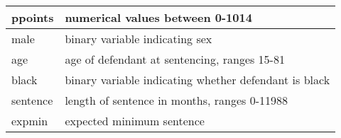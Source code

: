 \begin{tabular}{|l|l|}
ppoints           & numerical values between 0-1014                                  \\ \hline
male              & binary variable indicating sex                                   \\ \hline
age               & age of defendant at sentencing, ranges 15-81                     \\ \hline
black             & binary variable indicating whether defendant is black            \\ \hline
sentence          & length of sentence in months, ranges 0-11988                     \\ \hline
expmin            & expected minimum sentence                                        \\ \hline
\end{tabular}
